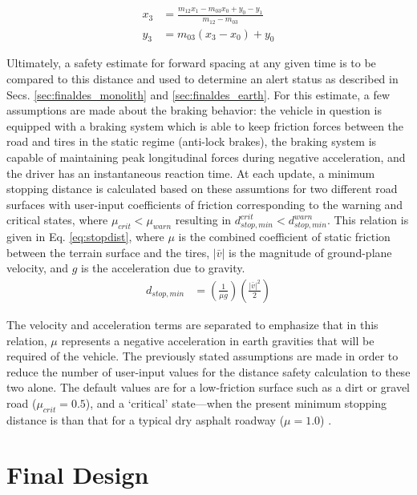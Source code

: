 \begin{align} 
    x_3 &= \frac{ m_{12} x_1 - m_{03} x_0 + y_0 - y_1 } { m_{12} - m_{03} } \label{eq:devprojx} \\
    y_3 &= m_{03} (x_3 - x_0) + y_0 \label{eq:devprojy}
\end{align}

Ultimately, a safety estimate for forward spacing at any given time is to be compared to this distance and used to determine an alert status as described in Secs. \ref{sec:finaldes_monolith} and \ref{sec:finaldes_earth}. For this estimate, a few assumptions are made about the braking behavior: the vehicle in question is equipped with a braking system which is able to keep friction forces between the road and tires in the static regime (anti-lock brakes), the braking system is capable of maintaining peak longitudinal forces during negative acceleration, and the driver has an instantaneous reaction time. At each update, a minimum stopping distance is calculated based on these assumtions for two different road surfaces with user-input coefficients of friction corresponding to the warning and critical states, where $\mu_{crit}<\mu_{warn}$ resulting in $d_{stop, min}^{crit} < d_{stop, min}^{warn}$. This relation is given in Eq. \eqref{eq:stopdist}, where $\mu$  is the combined coefficient of static friction between the terrain surface and the tires,  $|\bar{v}|$ is the magnitude of ground-plane velocity, and $g$ is the acceleration due to gravity.
\begin{align} \label{eq:stopdist}
    d_{stop, min} &= \left( \frac {1} {\mu g} \right) \left(\frac {|\bar{v}|^2} {2} \right)
\end{align}

The velocity and acceleration terms are separated to emphasize that in this relation, $\mu$ represents a negative acceleration in earth gravities that will be required of the vehicle. The previously stated assumptions are made in order to reduce the number of user-input values for the distance safety calculation to these two alone. The default values are for a low-friction surface such as a dirt or gravel road ($\mu_{crit}=0.5$), and a `critical' state---when the present minimum stopping distance is than that for a typical dry asphalt roadway ($\mu=1.0$) \cite{mu}. 

\section{Final Design} \label{sec:finaldes}

